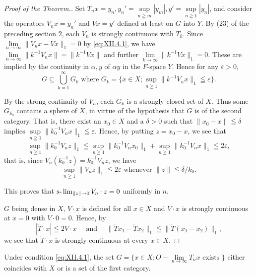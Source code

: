 \begin{proof}[Proof of the Theorem.]
Set $T_{n}x = y_{n}, y_{n}' = \sup\limits_{n\geqq m}|y_{m}|, y' = \sup\limits_{n\geqq 1}|y_{n}|$, and consider the operators $V_{n}x = y_{n}'$ and $Vx = y'$ defined at least on $G$ into $Y$. By ($23$) of the preceding section $2$, each $V_{n}$ is strongly continuous with $T_{k}$. Since $\lim\limits_{n\to \infty}\|V_n x - V x\|_1 = 0$ by \eqref{eq:XII.4.1}, we have $\lim\limits_{n\to \infty}\|k^{-1}V_n x\| = \|k^{-1}Vx\|$ and further $\lim\limits_{k\to \infty}\|k^{-1}Vx\|_1 = 0$. These are implied by the continuity in $\alpha, y$ of $\alpha y$ in the $F$-space $Y$. Hence for any $\varepsilon > 0$, 
\begin{equation}\label{eq:XII.4.4}
G \subseteq \bigcup\limits_{k=1}^{\infty} G_k \text{ where } G_k = \{x \in X; \sup\limits_{n\geqq 1}\|k^{-1}V_n x\|_1 \leqq \varepsilon\}.
\end{equation}

By the strong continuity of $V_{n}$, each $G_{k}$ is a strongly closed set of $X$. Thus some $G_{k_0}$ contains a sphere of $X$, in virtue of the hypothesis that $G$ is of the second category. That is, there exist an $x_0 \in X$ and a $\delta > 0$ such that $\|x_0 - x\| \leqq \delta$ implies $\sup\limits_{n \geqq 1} \|k_0^{-1} V_n x\|_1 \leqq \varepsilon$. Hence, by putting $z = x_0 - x$, we see that 
\[
\sup\limits _{n \geqq 1} \| k _{0} ^{-1} V _{n} z \| _{1} \leqq \sup\limits _{n \geqq 1} \| k _{0} ^{-1} V _{n} x _{0} \| _{1} + \sup\limits _{n \geqq 1} \| k _{0} ^{-1} V _{n} x \| _{1} \leqq 2 \varepsilon ,
\]
that is, since $V_{n}(k_{0}^{-1}z) = k_{0}^{-1}V_{n}z$, we have 
\[
\sup\limits _{n \geqq 1} \| V _{n} z \| _{1} \leqq 2 \varepsilon \text{ whenever } \| z \| \leqq \delta / k _{0}.
\]

This proves that $\text{s-}\lim\nolimits_{\|z\| \to 0} V_n \cdot z = 0$ uniformly in $n$. 

$G$ being dense in $X$, $V \cdot x$ is defined for all $x \in X$ and $V \cdot x$ is strongly continuous at $x = 0$ with $V \cdot 0 = 0$. Hence, by 
\[
| \tilde {T} \cdot x | \leqq 2 V \cdot x \quad \text{ and } \quad \| \tilde {T} x _{1} - \tilde {T} x _{2} \| _{1} \leqq \| \tilde {T} (x _{1} - x _{2}) \| _{1},
\]
we see that $\tilde{T} \cdot x$ is strongly continuous at every $x \in X$. 
\end{proof}

\begin{corollaryu} Under condition \eqref{eq:XII.4.1}, the set $G = \{x \in X; O - \lim\limits_{n \to \infty} T_n x \text{ exists }\}$ either coincides with $X$ or is a set of the first category. 
\end{corollaryu}

